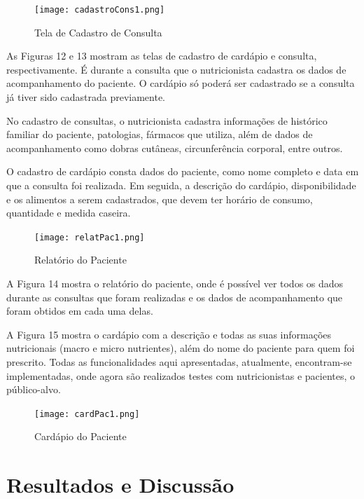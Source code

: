 \documentclass[
	12pt,				%
    oneside,			%
	a4paper,			%
	english,			%
	french,				%
	spanish,			%
	brazil,				%
	]{abntex2}
\begin{document}
\begin{figure} [hbt]
\label{cadastroCons} 
\caption{Tela de Cadastro de Consulta}
\begin{center}
\texttt{[image: cadastroCons1.png]}
\end{center}
\end{figure}

As Figuras 12 e 13 mostram as telas de cadastro de cardápio e consulta,
respectivamente. É durante a consulta que o nutricionista cadastra os dados de
acompanhamento do paciente. O cardápio só poderá ser cadastrado se a consulta já
tiver sido cadastrada previamente.

No cadastro de consultas, o nutricionista cadastra informações de histórico
familiar do paciente, patologias, fármacos que utiliza, além de dados de
acompanhamento como dobras cutâneas, circunferência corporal, entre outros.

O cadastro de cardápio consta dados do paciente, como nome completo e data
em que a consulta foi realizada. Em seguida, a descrição do cardápio, disponibilidade
e os alimentos a serem cadastrados, que devem ter horário de consumo, quantidade
e medida caseira.

\begin{figure} [hbt]
\label{relatPac} 
\caption{Relatório do Paciente}
\begin{center}
\texttt{[image: relatPac1.png]}
\end{center}
\end{figure}

A Figura 14 mostra o relatório do paciente, onde é possível ver todos os dados
durante as consultas que foram realizadas e os dados de acompanhamento que foram
obtidos em cada uma delas.

A Figura 15 mostra o cardápio com a descrição e todas as suas informações
nutricionais (macro e micro nutrientes), além do nome do paciente para quem foi
prescrito.
Todas as funcionalidades aqui apresentadas, atualmente, encontram-se
implementadas, onde agora são realizados testes com nutricionistas e pacientes, o público-alvo.

\begin{figure} [hbt]
\label{cardPac} 
\caption{Cardápio do Paciente}
\begin{center}
\texttt{[image: cardPac1.png]}
\end{center}
\end{figure}

\chapter{Resultados e Discussão}
\end{document}
